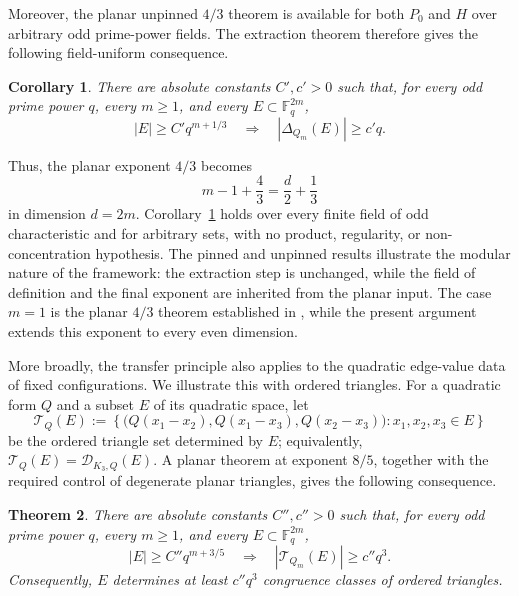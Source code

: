 \documentclass[11pt]{article}
\newtheorem{theorem}{Theorem}[section]
\newtheorem{corollary}[theorem]{Corollary}
\newcommand{\F}{\mathbb F}
\begin{document}
Moreover, the planar unpinned \(4/3\) theorem is available for both \(P_0\) and \(H\) over arbitrary odd prime-power fields.  The extraction theorem therefore gives the following field-uniform consequence.

\begin{corollary}
\label{cor:unpinned}
There are absolute constants \(C',c'>0\) such that, for every odd prime power \(q\), every \(m\geq1\), and every \(E\subset\F_q^{2m}\),
\begin{equation}
\label{eq:main}
|E|\geq C'q^{m+1/3} \quad\Longrightarrow\quad |\Delta_{Q_m}(E)|\geq c'q.
\end{equation}
\end{corollary}

Thus, the planar exponent \(4/3\) becomes
\[
m-1+\frac43 = \frac d2+\frac13
\]
in dimension \(d=2m\).  Corollary~\ref{cor:unpinned} holds over every finite field of odd characteristic and for arbitrary sets, with no
product, regularity, or non-concentration hypothesis.  The pinned and unpinned results illustrate the modular nature of the framework: the
extraction step is unchanged, while the field of definition and the final exponent are inherited from the planar input.  The case \(m=1\) is the planar \(4/3\) theorem established in \cite{CEHIK}, while the present argument extends this exponent to every even dimension. 

More broadly, the transfer principle also applies to the quadratic edge-value data of fixed configurations.  We illustrate this with ordered triangles.  For a quadratic form \(Q\) and a subset \(E\) of its quadratic space, let
\[
    \mathcal T_Q(E)
    :=
    \left\{
        \bigl(
            Q(x_1-x_2),
            Q(x_1-x_3),
            Q(x_2-x_3)
        \bigr)
        :
        x_1,x_2,x_3\in E
    \right\}
\]
be the ordered triangle set determined by \(E\); equivalently, \(\mathcal T_Q(E)=\mathcal D_{K_3,Q}(E)\).  A planar theorem at exponent
\(8/5\), together with the required control of degenerate planar triangles, gives the following consequence.


\begin{theorem} \label{triangle}
There are absolute constants \(C'' , c'' >0\) such that, for every odd prime power \(q\), every \(m\geq1\), and every
\(E\subset\F_q^{2m}\),
\[
    |E|\geq C'' q^{m+3/5} \quad\Longrightarrow\quad 
    |\mathcal T_{Q_m}(E)|
    \geq
    c'' q^3.
\]
Consequently, \(E\) determines at least \(c'' q^3\) congruence classes of ordered triangles.
\end{theorem}
\end{document}
